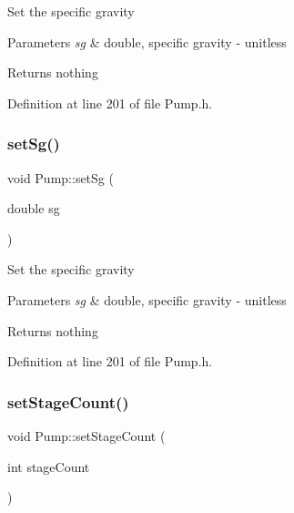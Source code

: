 Set the specific gravity


\begin{DoxyParams}{Parameters}
{\em sg} & double, specific gravity -\/ unitless\\
\hline
\end{DoxyParams}
\begin{DoxyReturn}{Returns}
nothing 
\end{DoxyReturn}


Definition at line 201 of file Pump.\+h.

\mbox{\label{class_pump_a9b9773b74e0e56acece38107ab547728}} 
\subsubsection{\texorpdfstring{set\+Sg()}{setSg()}\hspace{0.1cm}{\footnotesize\ttfamily [3/3]}}
{\footnotesize\ttfamily void Pump\+::set\+Sg (\begin{DoxyParamCaption}\item[{double}]{sg }\end{DoxyParamCaption})\hspace{0.3cm}{\ttfamily [inline]}}

Set the specific gravity


\begin{DoxyParams}{Parameters}
{\em sg} & double, specific gravity -\/ unitless\\
\hline
\end{DoxyParams}
\begin{DoxyReturn}{Returns}
nothing 
\end{DoxyReturn}


Definition at line 201 of file Pump.\+h.

\mbox{\label{class_pump_a28943405616a792c970b7e9bbf01c1b2}} 
\subsubsection{\texorpdfstring{set\+Stage\+Count()}{setStageCount()}\hspace{0.1cm}{\footnotesize\ttfamily [1/3]}}
{\footnotesize\ttfamily void Pump\+::set\+Stage\+Count (\begin{DoxyParamCaption}\item[{int}]{stage\+Count }\end{DoxyParamCaption})\hspace{0.3cm}{\ttfamily [inline]}}

